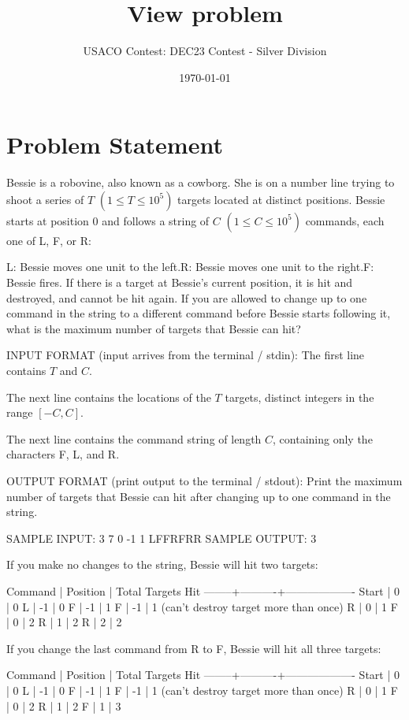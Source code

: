 \documentclass[12pt]{article}
\title{View problem}
\author{USACO Contest: DEC23 Contest - Silver Division}
\date{\today}
\begin{document}
\maketitle

\section*{Problem Statement}


Bessie is a robovine, also known as a cowborg. She is on a number line trying to
shoot a series of $T$ $(1 \leq T \leq 10^5)$ targets located at distinct
positions. Bessie  starts at position $0$ and follows a string of $C$
$(1 \leq C \leq 10^5)$ commands,  each one of L, F, or R:

L: Bessie moves one unit to the left.R: Bessie moves one unit to the right.F: Bessie fires. If there is a target at Bessie's current position, it is
hit and destroyed, and cannot be hit again.
If you are allowed to change up to one command in the string  to a different
command before Bessie starts following it, what is the maximum number of targets
that Bessie can hit?

INPUT FORMAT (input arrives from the terminal / stdin):
The first line contains $T$ and $C$.

The next line contains the locations of the $T$ targets, distinct integers in the range
$[-C,C]$.

The next line contains the command string of length $C$, containing only the
characters F, L, and R.

OUTPUT FORMAT (print output to the terminal / stdout):
Print the maximum number of targets that Bessie can hit after changing up to one
command  in the string.

SAMPLE INPUT:
3 7
0 -1 1
LFFRFRR
SAMPLE OUTPUT: 
3

If you make no changes to the string, Bessie will hit two targets:


Command | Position | Total Targets Hit
--------+----------+-------------------
Start   |  0       | 0 
L       | -1       | 0
F       | -1       | 1
F       | -1       | 1 (can't destroy target more than once)
R       |  0       | 1
F       |  0       | 2
R       |  1       | 2
R       |  2       | 2

If you change the last command from R to F, Bessie will hit all three targets:


Command | Position | Total Targets Hit
--------+----------+-------------------
Start   |  0       | 0 
L       | -1       | 0
F       | -1       | 1
F       | -1       | 1 (can't destroy target more than once)
R       |  0       | 1
F       |  0       | 2
R       |  1       | 2
F       |  1       | 3
\end{document}
